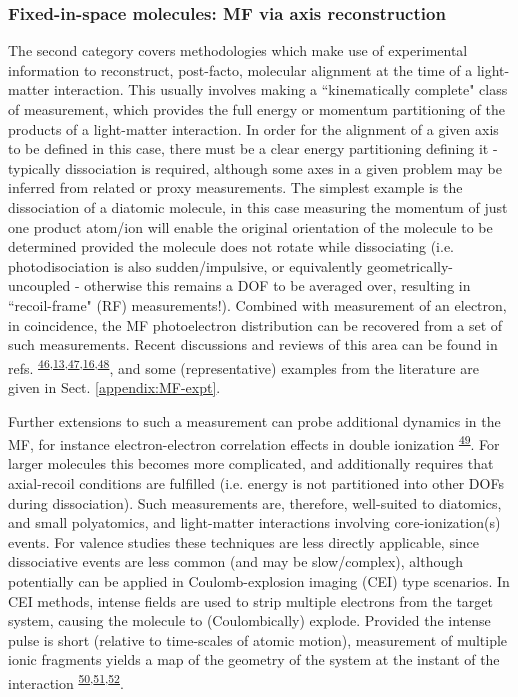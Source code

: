 \documentclass[10pt]{article}
\begin{document}
\subsubsection{Fixed-in-space molecules: MF via axis reconstruction\label{sec:fixed-in-space}}

The second category covers methodologies which make use of experimental information to reconstruct, post-facto, molecular alignment at the time of a light-matter interaction. This usually involves making a ``kinematically complete" class of measurement, which provides the full energy or momentum partitioning of the products of a light-matter interaction. In order for the alignment of a given axis to be defined in this case, there must be a clear energy partitioning defining it - typically dissociation is required, although some axes in a given problem may be inferred from related or proxy measurements. The simplest example is the dissociation of a diatomic molecule, in this case measuring the momentum of just one product atom/ion will enable the original orientation of the molecule to be determined 
provided the molecule does not rotate while dissociating (i.e. photodisociation is also sudden/impulsive, or equivalently geometrically-uncoupled - otherwise this remains a DOF to be averaged over, resulting in ``recoil-frame" (RF) measurements!). Combined with measurement of an electron, in coincidence, the MF photoelectron distribution can be recovered from a set of such measurements. Recent discussions and reviews of this area can be found in refs. \textsuperscript{\hyperref[csl:46]{46},\hyperref[csl:13]{13},\hyperref[csl:47]{47},\hyperref[csl:16]{16},\hyperref[csl:48]{48}}, and some (representative) examples from the literature are given in Sect. \ref{appendix:MF-expt}.


Further extensions to such a measurement can probe additional dynamics in the MF, for instance electron-electron correlation effects in double ionization \textsuperscript{\hyperref[csl:49]{49}}. %
For larger molecules this becomes more complicated, and additionally requires that axial-recoil conditions are fulfilled (i.e. energy is not partitioned into other DOFs during dissociation). Such measurements are, therefore, well-suited to diatomics, and small polyatomics, and light-matter interactions involving core-ionization(s) events. For valence studies these techniques are less directly applicable, since dissociative events are less common (and may be slow/complex), although potentially can be applied in Coulomb-explosion imaging (CEI) type scenarios. In CEI methods, intense fields are used to strip multiple electrons from the target system, causing the molecule to (Coulombically) explode. Provided the intense pulse is short (relative to time-scales of atomic motion), measurement of multiple ionic fragments yields a map of the geometry of the system at the instant of the interaction \textsuperscript{\hyperref[csl:50]{50},\hyperref[csl:51]{51},\hyperref[csl:52]{52}}. 
\end{document}
